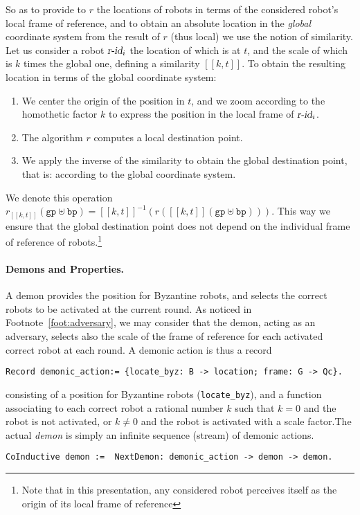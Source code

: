 \documentclass[11pt,a4]{llncs}
\newcommand{\x}{\xspace}
\newcommand{\gp}{\ensuremath{\texttt{gp}\x}}
\newcommand{\bp}{\ensuremath{\texttt{bp}\x}}
\newcommand{\sem}[1]{\ensuremath{[\![#1]\!]\x}}
\begin{document}
So as to provide to $r$ the locations of robots in terms of the
considered robot's local frame of reference, and to obtain an absolute
location in the \emph{global} coordinate system from
the result of $r$ (thus local) we use the notion of similarity.  Let
us consider a robot $\robid_i$ the location of which is at $t$, and
the scale of which is $k$ times the global one, defining a
similarity $\sem{k,t}$. To obtain the resulting location in terms of
the global coordinate system:
\begin{enumerate}
\item We center the origin of the position in $t$, and
we zoom according to the homothetic factor $k$ to express the
  position in 
  the local frame of  $\robid_i$.
\item The algorithm $r$ computes a local destination point.
\item We apply the inverse of the similarity to obtain the global destination
  point, that is: according to the global coordinate system.
\end{enumerate}
We denote this operation $r_{\sem{k,t}}(\gp \uplus \bp) =
\sem{k,t}^{-1}(r(\sem{k,t}(\gp \uplus \bp)))$.
This way we ensure that the global destination point does not depend
on the individual frame of reference of robots.\footnote{Note that in this
  presentation, any considered robot perceives itself as the origin of
  its local frame of reference}



\paragraph*{Demons and Properties.}\label{sec:formal-demons}
  A demon provides the position for Byzantine robots, and selects the
  correct robots to be activated at the current round. As noticed in
  Footnote~\ref{foot:adversary}, we may consider that the demon,
  acting as an adversary, selects also the scale of the frame of
  reference for each activated
  correct robot at each round. A demonic action is thus a record 
\begin{lstlisting}
Record demonic_action:= {locate_byz: B -> location; frame: G -> Qc}.
\end{lstlisting}
consisting of a position for Byzantine robots
(\lstinline!locate_byz!), and a function associating to each correct
robot a rational number $k$ such that $k = 0$ and the robot is not
activated, or $k \neq 0$ and the robot is activated with a scale
factor.The actual \emph{demon} is simply an infinite sequence (stream) of
demonic actions.
\begin{lstlisting}
CoInductive demon :=  NextDemon: demonic_action -> demon -> demon.
\end{lstlisting}
\end{document}
